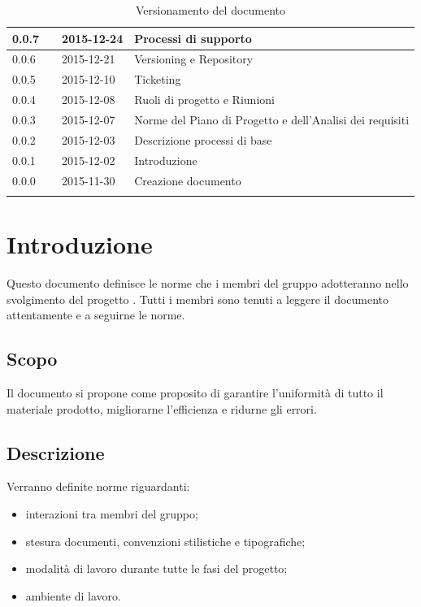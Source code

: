 \documentclass[12pt,a4paper]{article}
\begin{document}
\begin{center}
\begin{longtable}[H]{p{} p{} p{} p{}}
		\midrule
		0.0.7 & \NDC & 2015-12-24 & Processi di supporto \\*
		\midrule
		0.0.6 & \AVI & 2015-12-21 & Versioning e Repository \\*
		\midrule
		0.0.5 & \AVE & 2015-12-10 & Ticketing \\*
		\midrule
		0.0.4 & \AVE & 2015-12-08 & Ruoli di progetto e Riunioni \\*
		\midrule
		0.0.3 & \AVI & 2015-12-07 & Norme del Piano di Progetto e dell'Analisi dei requisiti \\*
		\midrule
		0.0.2 & \AVI & 2015-12-03 & Descrizione processi di base \\*
		\midrule 
		0.0.1 & \NDC & 2015-12-02 & Introduzione \\*
		\midrule
		0.0.0 & \NDC & 2015-11-30 & Creazione documento \\*
		\bottomrule
		\caption{Versionamento del documento}
		\label{tabVers1}
	\end{longtable}
\end{center}

\newpage
\tableofcontents
\newpage
\listoftables
\listoffigures
\newpage

\section{Introduzione}
Questo documento definisce le norme che i membri del gruppo \nomeGruppo{} adotteranno nello svolgimento del progetto \prjL. Tutti i membri sono tenuti a leggere il documento attentamente e a seguirne le norme.

\subsection{Scopo}
Il documento si propone come proposito di garantire l'uniformità di tutto il materiale prodotto, migliorarne l'efficienza e ridurne gli errori.

\subsection{Descrizione}
Verranno definite norme riguardanti:
\begin{itemize}
	\item interazioni tra membri del gruppo;
	\item stesura documenti, convenzioni stilistiche e tipografiche;
	\item modalità di lavoro durante tutte le fasi del progetto;
	\item ambiente di lavoro.
\end{itemize}
\end{document}
